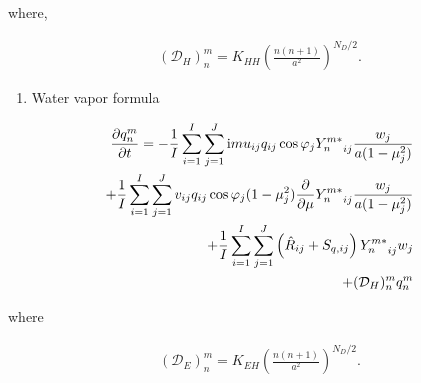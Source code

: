 where,

\begin{eqnarray}
({\mathcal D}_H)_n^m
   =  K_{HH} \left( \frac{n(n+1)}{a^{2}} \right)^{N_D/2} .
\end{eqnarray}

\begin{enumerate}
\def\labelenumi{\arabic{enumi}.}
\setcounter{enumi}{3}
\tightlist
\item
  Water vapor formula
\end{enumerate}

\begin{eqnarray}
  \frac{\partial{q_n^m}}{\partial {t}}
   =  - \frac{1}{I} \sum_{i=1}^{I} \sum_{j=1}^{J}  
          \mathrm{i}m u_{ij} q_{ij} \cos\varphi_j
          {Y_n^{m *}}_{ij} \frac{w_j}{a(1-\mu_j^{2})}
          \notag\\
     + \frac{1}{I} \sum_{i=1}^{I} \sum_{j=1}^{J}  
          v_{ij} q_{ij} \cos\varphi_j
          (1-\mu_j^2)
          \frac{\partial }{\partial \mu} {Y_n^{m *}}_{ij}
          \frac{w_j}{a(1-\mu_j^{2})}
          \notag\\
     + \frac{1}{I} \sum_{i=1}^{I} \sum_{j=1}^{J}  
          \left( \hat{R}_{ij} + S_{q,ij} \right)
          {Y_n^{m *}}_{ij} w_j
          \notag\\
     + ({\mathcal D}_H)_n^m q_n^m
\end{eqnarray}

where

\begin{eqnarray}
({\mathcal D}_E)_n^m
   =  K_{EH} \left( \frac{n(n+1)}{a^{2}} \right)^{N_D/2} .
\end{eqnarray}
